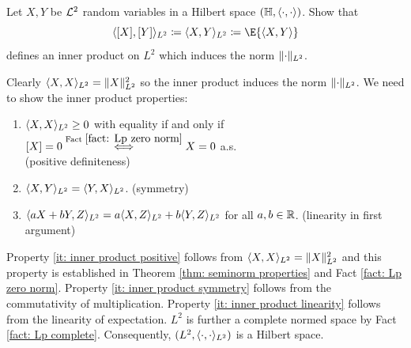 
\begin{exercise}[subtitle={\(L^2\)-Hilbertspace \Coffeecup}]
    \label{ex: L2 hilbert space}
    Let \(X,Y\) be \(\mathcal{L}^2\) random variables in a Hilbert space \((\mathbb{H}, \langle\cdot, \cdot\rangle)\).
    Show that 
    \[
        \langle [X], [Y] \rangle_{L^2} \coloneq \langle X, Y\rangle_{L^2} \coloneq \E{\scp{X,Y}}
    \]
    defines an inner product on \(L^2\) which induces the norm \(\lVert\cdot\rVert_{L^2}\).
\end{exercise}
\begin{solution}
    Clearly \(\langle X, X\rangle_{L^2} = \lVert X\rVert_{L^2}^2\) so the inner product induces
    the norm \(\lVert\cdot\rVert_{L^2}\). We need to show the inner product properties:
    \begin{enumerate}[label=(\roman*)]
        \item\label{it: inner product positive}
        \(\langle X, X\rangle_{L^2} \ge 0\) with equality if and only if \([X]=0 \overset{\text{Fact } \ref{fact: Lp zero norm}}\iff X=0\) a.s.
        \\ \null \hfill (positive definiteness)
        \item\label{it: inner product symmetry}
        \(\langle X, Y\rangle_{L^2} = \langle Y, X\rangle_{L^2}\).
        \hfill (symmetry)
        \item\label{it: inner product linearity}
        \(\langle aX + bY, Z\rangle_{L^2} = a \langle X, Z\rangle_{L^2} + b \langle Y, Z\rangle_{L^2}\)
        for all \(a,b\in \mathbb{R}\).
        \hfill (linearity in first argument)
    \end{enumerate}
    Property \ref{it: inner product positive} follows from \(\langle X, X\rangle_{L^2} = \lVert X\rVert_{L^2}^2\)
    and this property is established in Theorem \ref{thm: seminorm properties} and
    Fact \ref{fact: Lp zero norm}.
    Property \ref{it: inner product symmetry} follows from the
    commutativity of multiplication. Property \ref{it: inner product linearity}
    follows from the linearity of expectation.
    \(L^2\) is further a complete normed space by Fact \ref{fact: Lp complete}.
    Consequently, \((L^2, \langle\cdot, \cdot\rangle_{L^2})\) is a Hilbert space.
\end{solution}
